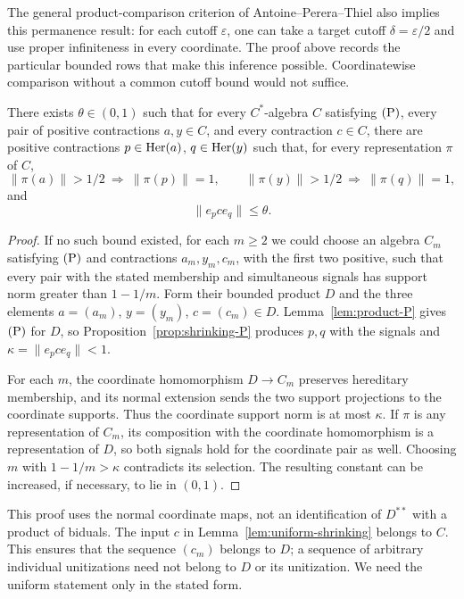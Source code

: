 The general product-comparison criterion of
Antoine--Perera--Thiel \cite[Lemma~5.7]{AntoinePereraThiel2020}
also implies this permanence result: for each cutoff
\(\varepsilon\), one can take a target cutoff
\(\delta=\varepsilon/2\) and use proper infiniteness in every
coordinate.  The proof above records the particular bounded
rows that make this inference possible.  Coordinatewise
comparison without a common cutoff bound would not suffice.

\begin{lemma}\label{lem:uniform-shrinking}
There exists \(\theta\in(0,1)\) such that for every
\(C^*\)-algebra \(C\) satisfying \(\textup{(P)}\), every pair of positive
contractions \(a,y\in C\), and every contraction \(c\in C\),
there are positive contractions \(p\in\operatorname{Her}(a)\),
\(q\in\operatorname{Her}(y)\) such that, for every representation \(\pi\) of
\(C\),
\[
 \|\pi(a)\|>1/2\ \Longrightarrow\ \|\pi(p)\|=1,
 \qquad
 \|\pi(y)\|>1/2\ \Longrightarrow\ \|\pi(q)\|=1,
\]
and
\begin{equation}\label{eq:uniform-support}
 \|e_p c e_q\|\le\theta.
\end{equation}
\end{lemma}

\begin{proof}
If no such bound existed, for each \(m\ge2\) we could choose
an algebra \(C_m\) satisfying \(\textup{(P)}\) and contractions
\(a_m,y_m,c_m\), with the first two positive, such that every
pair with the stated membership and simultaneous signals has
support norm greater than \(1-1/m\).  Form their bounded
product \(D\) and the three elements \(a=(a_m)\),
\(y=(y_m)\), \(c=(c_m)\in D\).  Lemma~\ref{lem:product-P}
gives \(\textup{(P)}\) for \(D\), so
Proposition~\ref{prop:shrinking-P} produces \(p,q\) with the
signals and \(\kappa=\|e_pce_q\|<1\).

For each \(m\), the coordinate homomorphism \(D\to C_m\)
preserves hereditary membership, and its normal extension sends
the two support projections to the coordinate supports.
Thus the coordinate support norm is at most \(\kappa\).
If \(\pi\) is any representation of \(C_m\), its composition
with the coordinate homomorphism is a representation of \(D\),
so both signals hold for the coordinate pair as well.  Choosing
\(m\) with \(1-1/m>\kappa\) contradicts its selection.
The resulting constant can be increased, if necessary, to lie
in \((0,1)\).
\end{proof}

This proof uses the normal coordinate maps, not an identification
of \(D^{**}\) with a product of biduals.  The input \(c\) in
Lemma~\ref{lem:uniform-shrinking} belongs to \(C\).
This ensures that the sequence \((c_m)\) belongs to \(D\);
a sequence of arbitrary individual unitizations need not belong
to \(D\) or its unitization.  We need the uniform statement
only in the stated form.

